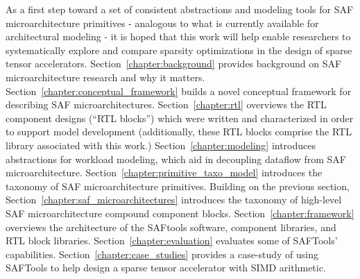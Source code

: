 As a first step toward a set of consistent abstractions and modeling tools for SAF microarchitecture primitives - analogous to what is currently available for architectural modeling - it is hoped that this work will help enable researchers to systematically explore and compare sparsity optimizations in the design of sparse tensor accelerators. Section~\ref{chapter:background} provides background on SAF microarchitecture research and why it matters. Section~\ref{chapter:conceptual_framework} builds a novel conceptual framework for describing SAF microarchitectures. Section~\ref{chapter:rtl} overviews the RTL component designs (``RTL blocks'') which were written and characterized in order to support model development (additionally, these RTL blocks comprise the RTL library associated with this work.) Section~\ref{chapter:modeling} introduces abstractions for workload modeling, which aid in decoupling dataflow from SAF microarchitecture. Section~\ref{chapter:primitive_taxo_model} introduces the taxonomy of SAF microarchitecture primitives. Building on the previous section, Section~\ref{chapter:saf_microarchitectures} introduces the taxonomy of high-level SAF microarchitecture compound component blocks. Section~\ref{chapter:framework} overviews the architecture of the SAFtools software, component libraries, and RTL block libraries. Section~\ref{chapter:evaluation} evaluates some of SAFTools' capabilities. Section~\ref{chapter:case_studies} provides a case-study of using SAFTools to help design a sparse tensor accelerator with SIMD arithmetic.

